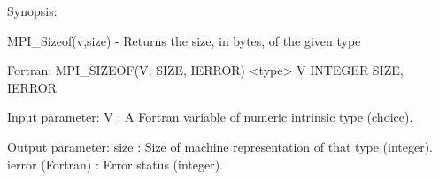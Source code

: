 Synopsis:

MPI_Sizeof(v,size) - Returns the size, in bytes, of the given type

Fortran:
MPI_SIZEOF(V, SIZE, IERROR)
<type>    V
INTEGER    SIZE, IERROR

Input parameter:
V : A Fortran variable of numeric intrinsic type (choice).

Output parameter:
size : Size of machine representation of that type (integer).
ierror (Fortran) : Error status (integer).


